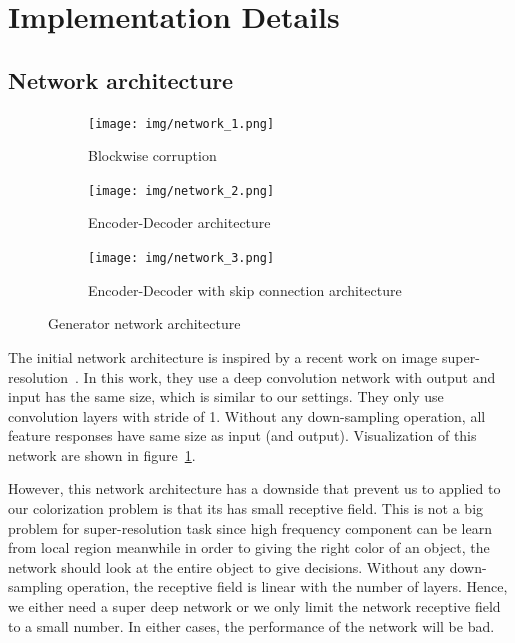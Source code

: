 \documentclass[10pt,twocolumn,letterpaper]{article}
\begin{document}
\section{Implementation Details}
\subsection{Network architecture}


\begin{figure} [t!]
    \centering
    \begin{subfigure}[b]{0.49\textwidth}
        \texttt{[image: img/network\_1.png]}
        \caption{Blockwise corruption}
        \label{fig:network_1}
    \end{subfigure}
    \begin{subfigure}[b]{0.49\textwidth}
        \texttt{[image: img/network\_2.png]}
        \caption{Encoder-Decoder architecture}
        \label{fig:network_2}
    \end{subfigure}
    \begin{subfigure}[b]{0.49\textwidth}
        \texttt{[image: img/network\_3.png]}
        \caption{Encoder-Decoder with skip connection architecture}
        \label{fig:network_3}
    \end{subfigure}
    \caption{\small Generator network architecture}
    \vspace{-0.2in}
   \label{fig:network}
\end{figure}

The initial network architecture is inspired by a recent work on image super-resolution~\cite{kim2015accurate}. In this work, they use a deep convolution network with output and input has the same size, which is similar to our settings. They only use convolution layers with stride of 1. Without any down-sampling operation, all feature responses have same size as input (and output). Visualization of this network are shown in figure~\ref{fig:network_1}.

However, this network architecture has a downside that prevent us to applied to our colorization problem is that its has small receptive field. This is not a big problem for super-resolution task since high frequency component can be learn from local region meanwhile in order to giving the right color of an object, the network should look at the entire object to give decisions. Without any down-sampling operation, the receptive field is linear with the number of layers. Hence, we either need a super deep network or we only limit the network receptive field to a small number. In either cases, the performance of the network will be bad.
\end{document}
